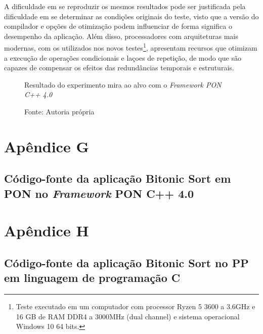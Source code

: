 A dificuldade em se reproduzir os mesmos resultados pode ser justificada pela
dificuldade em se determinar as condições originais do teste, visto que a versão
do compilador e opções de otimização podem influenciar de forma significa o
desempenho da aplicação. Além disso, processadores com arquiteturas mais
modernas, com os utilizados nos novos testes\footnote{Teste executado em um
computador com processor Ryzen 5 3600 a 3.6GHz e 16 GB de RAM DDR4 a 3000MHz
(dual channel) e sistema operacional Windows 10 64 bits.}, apresentam recursos
que otimizam a execução de operações condicionais e laçoes de repetição, de modo
que são capazes de compensar os efeitos das redundâncias temporais e
estruturais.

\begin{figure}[t!]
\centering
{}
\caption{Resultado do experimento mira ao alvo com o \textit{Framework PON C++ 4.0}}
\caption*{Fonte: Autoria própria}
\label{fig:mira_alvo_result_2}
\end{figure}


\chapter*{Apêndice G}\label{ap:apendice_bitonic}
\section*{Código-fonte da aplicação Bitonic Sort em PON no \textit{Framework} PON C++ 4.0}


\chapter*{Apêndice H}\label{ap:bitonic_c}
\section*{Código-fonte da aplicação Bitonic Sort no PP em linguagem de programação C}


